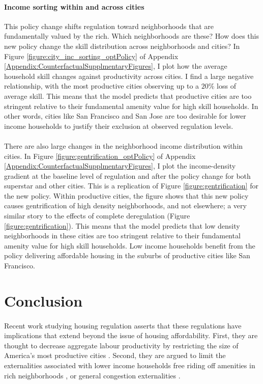 \documentclass[12pt]{article}
\begin{document}
\paragraph*{Income sorting within and across cities}
This policy change shifts regulation toward neighborhoods that are fundamentally valued by the rich. Which neighborhoods are these? How does this new policy change the skill distribution across neighborhoods and cities? In Figure \ref{figure:city_inc_sorting_optPolicy} of Appendix \ref{Appendix:CounterfactualSupplmentaryFigures}, I plot how the average household skill changes against productivity across cities. I find a large negative relationship, with the most productive cities observing up to a $20\%$ loss of average skill. This means that the model predicts that productive cities are too stringent relative to their fundamental amenity value for high skill households. In other words, cities like San Francisco and San Jose are too desirable for lower income households to justify their exclusion at observed regulation levels.

\paragraph*{}
There are also large changes in the neighborhood income distribution within cities. In Figure \ref{figure:gentrification_optPolicy} of Appendix \ref{Appendix:CounterfactualSupplmentaryFigures}, I plot the income-density gradient at the baseline level of regulation and after the policy change for both superstar and other cities. This is a replication of Figure \ref{figure:gentrification} for the new policy. Within productive cities, the figure shows that this new policy causes gentrification of high density neighborhoods, and not elsewhere; a very similar story to the effects of complete deregulation (Figure \ref{figure:gentrification}). This means that the model predicts that low density neighborhoods in these cities are too stringent relative to their fundamental amenity value for high skill households. Low income households benefit from the policy delivering affordable housing in the suburbs of productive cities like San Francisco.


  


\section{Conclusion}\label{Section:Conclusion}
	\paragraph*{}
	Recent work studying housing regulation asserts that these regulations have implications that extend beyond the issue of housing affordability. First, they are thought to decrease aggregate labour productivity by restricting the size of America's most productive cities \citep{glaesergyourko2018, hseihmoretti, durantonpugaurbgrowth, parkho}. Second, they are argued to limit the externalities associated with lower income households free riding off amenities in rich neighborhoods \citep{hamilton1976, ineffTiebout, brueckner2021}, or general congestion externalities \citep{parkho, glaesergyourko2018}. 
\end{document}

